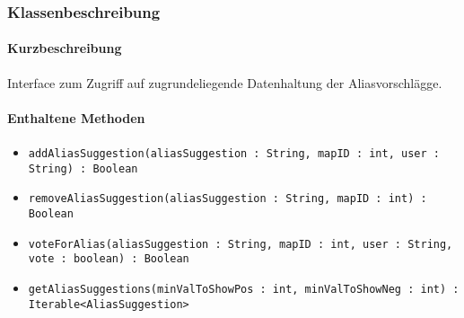 \subsubsection*{Klassenbeschreibung}%
\paragraph*{Kurzbeschreibung}
Interface zum Zugriff auf zugrundeliegende Datenhaltung der Aliasvorschlägge.
\paragraph*{Enthaltene Methoden}
\begin{itemize}
    \item \texttt{addAliasSuggestion(aliasSuggestion : String, mapID : int, user : String) : Boolean}
    \item \texttt{removeAliasSuggestion(aliasSuggestion : String, mapID : int) : Boolean} 
    \item \texttt{voteForAlias(aliasSuggestion : String, mapID : int, user : String, vote : boolean) : Boolean}
    \item \texttt{getAliasSuggestions(minValToShowPos : int, minValToShowNeg : int) : Iterable<AliasSuggestion>}
\end{itemize}

